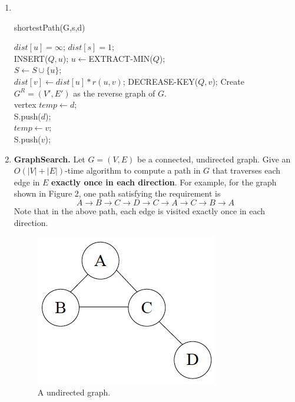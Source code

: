 \documentclass[12pt,a4paper]{article}
\makeatletter
\newtheorem*{solution}{Solution}
\theoremstyle{definition}
\renewenvironment{solution}[1][Solution] {\par\pushQED{\qed}\normalfont\topsep6\p@\@plus6\p@\relax\trivlist\item[\hskip\labelsep\bfseries#1\@addpunct{.}]\ignorespaces}{\popQED\endtrivlist\@endpefalse} \makeatother
\makeatother
\begin{document}
\begin{enumerate}
\begin{solution}
\ \\
\begin{minipage}[t]{0.9\textwidth}
\begin{algorithm}[H]
	\caption{shortestPath(G,s,d)}
	{
		$dist[u]=\infty$;
	}
	$dist[s]=1$;\\
	{
		INSERT($Q,u$);
	}
	{
		$u\leftarrow$EXTRACT-MIN($Q$);\\
		$S\leftarrow S\cup\{u\}$;\\
		{
			{
				$dist[v]\leftarrow dist[u]*r(u,v)$;
				DECREASE-KEY($Q,v$);
			}
		}
	}
	Create $G^R=(V',E')$ as the reverse graph of $G$.\\
	vertex $temp\leftarrow d$;\\
	S.push($d$);\\
	{
		{
			{
				$temp\leftarrow v$;\\
				S.push($v$);
			}
		}
	}
\end{algorithm}
\end{minipage}		
\end{solution}

\item \textbf{GraphSearch.} Let $G=(V,E)$ be a connected, undirected graph. Give an $O(|V|+|E|)$-time algorithm to compute a path in $G$ that traverses each edge in $E$ \textbf{exactly once in each direction}. For example, for the graph shown in Figure 2, one path satisfying the requirement is
$$A \rightarrow B \rightarrow C \rightarrow D \rightarrow C \rightarrow A \rightarrow C \rightarrow B \rightarrow A$$
Note that in the above path, each edge is visited exactly once in each direction.

\begin{figure}[h]
 \centering
 \includegraphics[scale=0.35]{Lab08-figure2.jpg}
 \caption{A undirected graph.}
\end{figure}


\end{enumerate}
\end{document}
